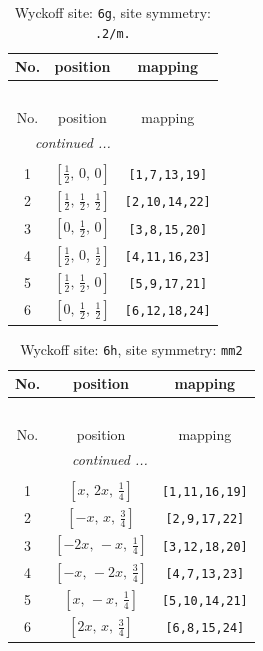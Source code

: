 \documentclass[fleqn,8pt]{jsarticle}
\begin{document}
\renewcommand{\arraystretch}{1.2}
\begin{longtable}{ccc}
\caption{Wyckoff site: {\tt 6g}, site symmetry: {\tt .2/m.}}
 \\
 \hline \hline
No. & position & mapping \\ \hline \endfirsthead

\multicolumn{2}{l}{\tablename\ \thetable{}} \\
 \hline \hline
No. & position & mapping \\ \hline \endhead

 \hline \hline
\multicolumn{2}{r}{\footnotesize\it continued ...} \\ \endfoot

 \hline \hline
\multicolumn{2}{r}{} \\ \endlastfoot

1 & $\left[ \frac{1}{2},\, 0,\, 0 \right]$ & {\tt [1,7,13,19]} \\ \hline
2 & $\left[ \frac{1}{2},\, \frac{1}{2},\, \frac{1}{2} \right]$ & {\tt [2,10,14,22]} \\ \hline
3 & $\left[ 0,\, \frac{1}{2},\, 0 \right]$ & {\tt [3,8,15,20]} \\ \hline
4 & $\left[ \frac{1}{2},\, 0,\, \frac{1}{2} \right]$ & {\tt [4,11,16,23]} \\ \hline
5 & $\left[ \frac{1}{2},\, \frac{1}{2},\, 0 \right]$ & {\tt [5,9,17,21]} \\ \hline
6 & $\left[ 0,\, \frac{1}{2},\, \frac{1}{2} \right]$ & {\tt [6,12,18,24]} \\
\end{longtable}
\renewcommand{\arraystretch}{1.2}
\begin{longtable}{ccc}
\caption{Wyckoff site: {\tt 6h}, site symmetry: {\tt mm2}}
 \\
 \hline \hline
No. & position & mapping \\ \hline \endfirsthead

\multicolumn{2}{l}{\tablename\ \thetable{}} \\
 \hline \hline
No. & position & mapping \\ \hline \endhead

 \hline \hline
\multicolumn{2}{r}{\footnotesize\it continued ...} \\ \endfoot

 \hline \hline
\multicolumn{2}{r}{} \\ \endlastfoot

1 & $\left[ x,\, 2 x,\, \frac{1}{4} \right]$ & {\tt [1,11,16,19]} \\ \hline
2 & $\left[ - x,\, x,\, \frac{3}{4} \right]$ & {\tt [2,9,17,22]} \\ \hline
3 & $\left[ - 2 x,\, - x,\, \frac{1}{4} \right]$ & {\tt [3,12,18,20]} \\ \hline
4 & $\left[ - x,\, - 2 x,\, \frac{3}{4} \right]$ & {\tt [4,7,13,23]} \\ \hline
5 & $\left[ x,\, - x,\, \frac{1}{4} \right]$ & {\tt [5,10,14,21]} \\ \hline
6 & $\left[ 2 x,\, x,\, \frac{3}{4} \right]$ & {\tt [6,8,15,24]} \\
\end{longtable}
\end{document}
